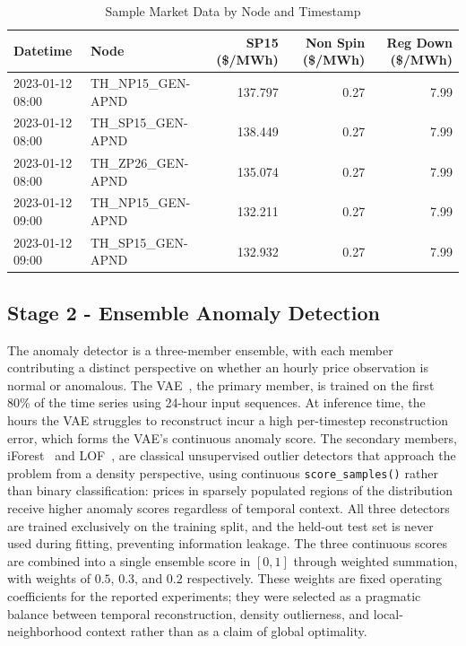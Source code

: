 \documentclass[journal]{IEEEtran}
\begin{document}
\begin{table}[!t]
\centering
\caption{Sample Market Data by Node and Timestamp}
\label{tab:market_data}
\begin{tabular}{llrrr}
\hline
\textbf{Datetime} & \textbf{Node} & \textbf{SP15 (\$/MWh)} & \textbf{Non Spin (\$/MWh)} & \textbf{Reg Down (\$/MWh)} \\
\hline
2023-01-12 08:00 & TH\_NP15\_GEN-APND & 137.797 & 0.27 & 7.99 \\
2023-01-12 08:00 & TH\_SP15\_GEN-APND & 138.449 & 0.27 & 7.99 \\
2023-01-12 08:00 & TH\_ZP26\_GEN-APND & 135.074 & 0.27 & 7.99 \\
2023-01-12 09:00 & TH\_NP15\_GEN-APND & 132.211 & 0.27 & 7.99 \\
2023-01-12 09:00 & TH\_SP15\_GEN-APND & 132.932 & 0.27 & 7.99 \\
\hline
\end{tabular}
\end{table}

\subsection{Stage 2 - Ensemble Anomaly Detection}
The anomaly detector is a three-member ensemble, with each member contributing a distinct perspective on whether an hourly price observation is normal or anomalous. The VAE~\cite{VAE}, the primary member, is trained on the first 80\% of the time series using 24-hour input sequences. At inference time, the hours the VAE struggles to reconstruct incur a high per-timestep reconstruction error, which forms the VAE's continuous anomaly score. The secondary members, iForest~\cite{IForest} and LOF~\cite{LOF}, are classical unsupervised outlier detectors that approach the problem from a density perspective, using continuous \texttt{score\_samples()} rather than binary classification: prices in sparsely populated regions of the distribution receive higher anomaly scores regardless of temporal context. All three detectors are trained exclusively on the training split, and the held-out test set is never used during fitting, preventing information leakage. The three continuous scores are combined into a single ensemble score in $[0, 1]$ through weighted summation, with weights of $0.5$, $0.3$, and $0.2$ respectively. These weights are fixed operating coefficients for the reported experiments; they were selected as a pragmatic balance between temporal reconstruction, density outlierness, and local-neighborhood context rather than as a claim of global optimality.
\end{document}
